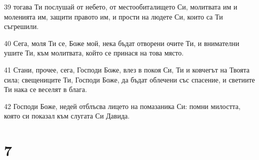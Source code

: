 \par 39 тогава Ти послушай от небето, от местообиталището Си, молитвата им и моленията им, защити правото им, и прости на людете Си, които са Ти съгрешили.
\par 40 Сега, моля Ти се, Боже мой, нека бъдат отворени очите Ти, и внимателни ушите Ти, към молитвата, който се принася на това място.
\par 41 Стани, прочее, сега, Господи Боже, влез в покоя Си, Ти и ковчегът на Твоята сила; свещениците Ти, Господи Боже, да бъдат облечени със спасение, и светиите Ти нака се веселят в блага.
\par 42 Господи Боже, недей отблъсва лицето на помазаника Си: помни милостта, която си показал към слугата Си Давида.

\chapter{7}

